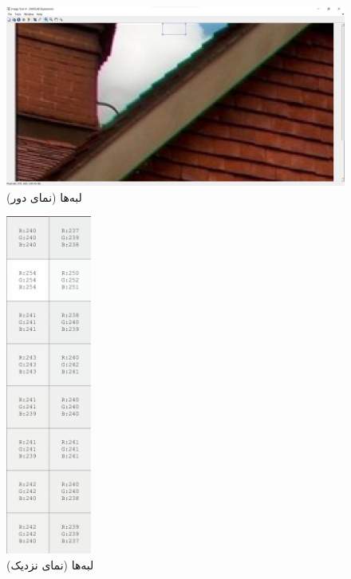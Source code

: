 \documentclass{article}
\begin{document}
\begin{figure}[H]
    \centering
    \includegraphics[width=1.0\textwidth]{figures/5p3p.jpg}
    \caption
	{
لبه‌ها (نمای دور)
	}
    \label{fig:fig1}
\end{figure}
\begin{figure}[H]
    \centering
    \includegraphics[width=0.25\textwidth]{figures/5p3.jpg}
    \caption
	{
لبه‌ها (نمای نزدیک)
	}
    \label{fig:fig1}
\end{figure}


\subsection{}
\begin{latin}

\end{latin}
\end{document}
